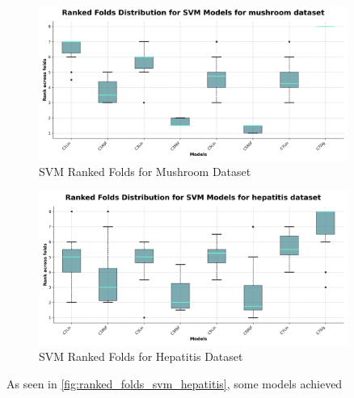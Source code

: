 \begin{figure}
    \centering
    \includegraphics[width=0.9\textwidth]{figures/ranked_folds_SVM_mushroom.png}
    \caption{SVM Ranked Folds for Mushroom Dataset}
    \label{fig:ranked_folds_svm_mushroom}
\end{figure}

\begin{figure}
    \centering
    \includegraphics[width=0.9\textwidth]{figures/ranked_folds_SVM_hepatitis.png}
    \caption{SVM Ranked Folds for Hepatitis Dataset}
    \label{fig:ranked_folds_svm_hepatitis}
\end{figure}

As seen in \autoref{fig:ranked_folds_svm_hepatitis}, some models achieved 

